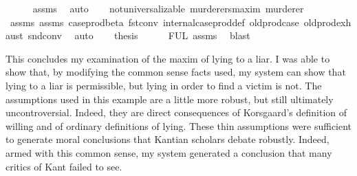 \begin{isabellebody}
\ \ \ \ \isamarkupfalse%
\ assms{\isacharparenleft}{}{\isacharparenright}\ \isamarkupfalse%
\ auto\isanewline
\ \ \isamarkupfalse%
\ {\isachardoublequoteopen}not{\isacharunderscore}universalizable\ murderers{\isacharunderscore}maxim\ murderer{\isachardoublequoteclose}\isanewline
\ \ \ \ \isamarkupfalse%
\ assms{\isacharparenleft}{}{\isacharparenright}\ assms{\isacharparenleft}{}{\isacharparenright}\ case{\isacharunderscore}prod{\isacharunderscore}beta\ fst{\isacharunderscore}conv\ internal{\isacharunderscore}case{\isacharunderscore}prod{\isacharunderscore}def\ old{\isachardot}prod{\isachardot}case\ old{\isachardot}prod{\isachardot}exhaust\ snd{\isacharunderscore}conv\ \isamarkupfalse%
\ auto\isanewline
\ \ \isamarkupfalse%
\ {\isacharquery}thesis\isanewline
\ \ \ \ \isamarkupfalse%
\ FUL\ assms{\isacharparenleft}{}{\isacharparenright}\ \isamarkupfalse%
\ blast\ \isanewline
{}\isamarkupfalse%
%
\endisatagproof
{\isafoldproof}%
%
\isadelimproof
%
\endisadelimproof
%
\begin{isamarkuptext}%
This concludes my examination of the maxim of lying to a liar. I was able to show that, by
modifying the common sense facts used, my system can show that lying to a liar is permissible, but lying 
in order to find a victim is not. The assumptions used in this example are a little more robust, but still
ultimately uncontroversial. Indeed, they are direct consequences of Korsgaard's definition of willing 
and of ordinary definitions of lying. These thin assumptions were sufficient to generate moral conclusions
that Kantian scholars debate robustly. Indeed, armed with this common sense, my system generated 
a conclusion that many critics of Kant failed to see.


\end{isamarkuptext}
\end{isabellebody}
